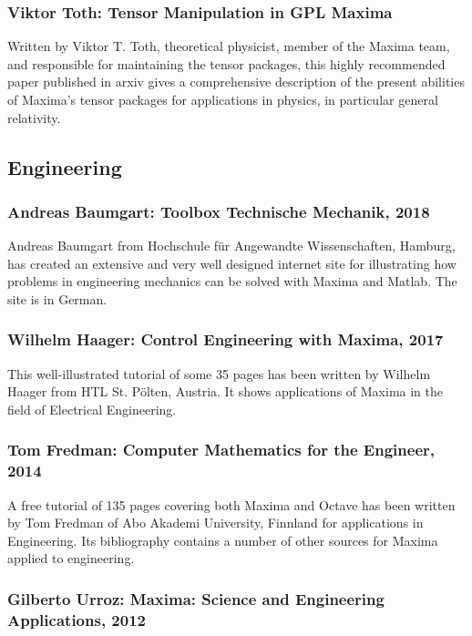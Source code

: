 \documentclass[../Maxima_Workbook.tex]{subfiles}
\begin{document}
\subsubsection{Viktor Toth: Tensor Manipulation in GPL Maxima}

Written by Viktor T. Toth, theoretical physicist, member of the Maxima team, and responsible for maintaining the tensor packages, this highly recommended paper published in arxiv gives a comprehensive description of the present abilities of Maxima's tensor packages for applications in physics, in particular general relativity.

\subsection{Engineering}

\subsubsection{Andreas Baumgart: Toolbox Technische Mechanik, 2018}

Andreas Baumgart from Hochschule für Angewandte Wissenschaften, Hamburg, has created an extensive and very well designed internet site for illustrating how problems in engineering mechanics can be solved with Maxima and Matlab. The site is in German.

\subsubsection{Wilhelm Haager: Control Engineering with Maxima, 2017}

This well-illustrated tutorial of some 35 pages has been written by Wilhelm Haager from HTL St. Pölten, Austria. It shows applications of Maxima in the field of Electrical Engineering.

\subsubsection{Tom Fredman: Computer Mathematics for the Engineer, 2014}
A free tutorial of 135 pages covering both Maxima and Octave has been written by Tom Fredman of Abo Akademi University, Finnland for applications in Engineering. Its bibliography contains a number of other sources for Maxima applied to engineering.

\subsubsection{Gilberto Urroz: Maxima: Science and Engineering Applications, 2012}
\end{document}
